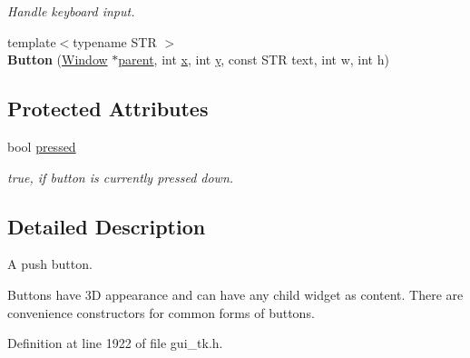 \begin{DoxyCompactItemize}
\begin{DoxyCompactList}\small\item\em Handle keyboard input. \end{DoxyCompactList}\item 
\hypertarget{classGUI_1_1Button_ada8368b22e9bfcfa7ba9199f9ea3f7cc}{{\footnotesize template$<$typename S\-T\-R $>$ }\\{\bfseries Button} (\hyperlink{classGUI_1_1Window}{Window} $\ast$\hyperlink{classGUI_1_1Window_a2e593ff65e7702178d82fe9010a0b539}{parent}, int \hyperlink{classGUI_1_1Window_a6ca6a80ca00c9e1d8ceea8d3d99a657d}{x}, int \hyperlink{classGUI_1_1Window_a0ee8e923aff2c3661fc2e17656d37adf}{y}, const S\-T\-R text, int w, int h)}\label{classGUI_1_1Button_ada8368b22e9bfcfa7ba9199f9ea3f7cc}

\end{DoxyCompactItemize}
\subsection*{Protected Attributes}
\begin{DoxyCompactItemize}
\item 
\hypertarget{classGUI_1_1Button_aec37fa9a4a6ea6d1e0e2788d42d67ee1}{bool \hyperlink{classGUI_1_1Button_aec37fa9a4a6ea6d1e0e2788d42d67ee1}{pressed}}\label{classGUI_1_1Button_aec37fa9a4a6ea6d1e0e2788d42d67ee1}

\begin{DoxyCompactList}\small\item\em {\ttfamily true}, if button is currently pressed down. \end{DoxyCompactList}\end{DoxyCompactItemize}


\subsection{Detailed Description}
A push button. 

Buttons have 3\-D appearance and can have any child widget as content. There are convenience constructors for common forms of buttons. 

Definition at line 1922 of file gui\-\_\-tk.\-h.



